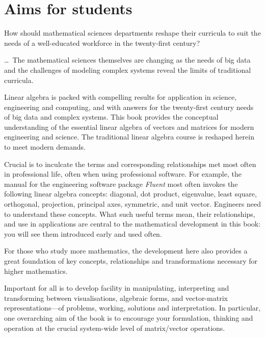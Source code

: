\section*{Aims for students}

\begin{quoted}{\cite{Bressoud2014}}
How should mathematical sciences departments reshape their curricula to suit the needs of a well-educated workforce in the twenty-first century?

\ldots\
The mathematical sciences themselves are changing as the needs of big data and the challenges of modeling complex systems reveal the limits of traditional curricula.
%
\end{quoted}



Linear algebra is packed with compelling results for application in science, engineering and computing, and with answers for the twenty-first century needs of big data and complex systems.
This book provides the conceptual understanding of the essential linear algebra of vectors and matrices for modern engineering and science.
The traditional linear algebra course is reshaped herein to meet modern demands.

Crucial is to inculcate the terms and corresponding relationships met most often in professional life, often when using professional software.  
For example, the manual for the engineering software package \emph{Fluent} most often invokes the following linear algebra concepts: diagonal, dot product, eigenvalue, least square, orthogonal, projection, principal axes, symmetric, and unit vector.
Engineers need to understand these concepts.
What such useful terms mean, their relationships, and use in applications are central to the mathematical development in this book: you will see them introduced early and used often.

For those who study more mathematics, the development here also provides a great foundation of key concepts, relationships and transformations necessary for higher mathematics. 

Important for all is to develop facility in manipulating, interpreting and transforming between visualisations, algebraic forms, and vector-matrix representations---of problems, working, solutions and interpretation.
In particular, one overarching aim of the book is to encourage your formulation, thinking and operation at the crucial system-wide level of matrix\slash vector operations.

